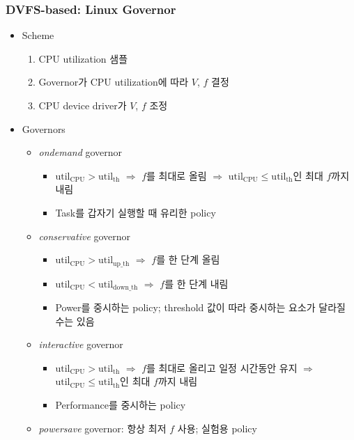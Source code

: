 \subsubsection*{DVFS-based: Linux Governor}
\begin{itemize}
    \item Scheme
    \begin{enumerate}
        \item CPU utilization 샘플
        \item Governor가 CPU utilization에 따라 $V$, $f$ 결정
        \item CPU device driver가 $V$, $f$ 조정
    \end{enumerate}
    \newpage
    \item Governors
    \begin{itemize}
        \item \textit{ondemand} governor
        \begin{itemize}
            \item $\mathrm{util_{CPU}}>\mathrm{util_{th}}$ $\Rightarrow$ $f$를 최대로 올림 $\Rightarrow$ $\mathrm{util_{CPU}}\leq\mathrm{util_{th}}$인 최대 $f$까지 내림
            \item Task를 갑자기 실행할 때 유리한 policy
        \end{itemize}
        \item \textit{conservative} governor
        \begin{itemize}
            \item $\mathrm{util_{CPU}}>\mathrm{util_{up\_th}}$ $\Rightarrow$ $f$를 한 단계 올림
            \item $\mathrm{util_{CPU}}<\mathrm{util_{down\_th}}$ $\Rightarrow$ $f$를 한 단계 내림
            \item Power를 중시하는 policy; threshold 값이 따라 중시하는 요소가 달라질 수는 있음
        \end{itemize}
        \item \textit{interactive} governor
        \begin{itemize}
            \item $\mathrm{util_{CPU}}>\mathrm{util_{th}}$ $\Rightarrow$ $f$를 최대로 올리고 일정 시간동안 유지 $\Rightarrow$ $\mathrm{util_{CPU}}\leq\mathrm{util_{th}}$인 최대 $f$까지 내림
            \item Performance를 중시하는 policy
        \end{itemize}
        \item \textit{powersave} governor: 항상 최저 $f$ 사용; 실험용 policy

\end{itemize}
\end{itemize}
